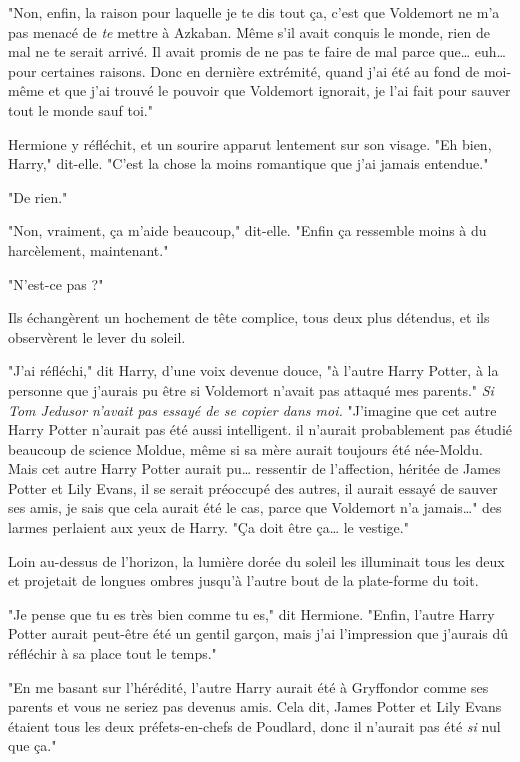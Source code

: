 "Non, enfin, la raison pour laquelle je te dis tout ça, c'est que Voldemort ne m'a pas menacé de \emph{te}  mettre à Azkaban. Même s'il avait conquis le monde, rien de mal ne te serait arrivé. Il avait promis de ne pas te faire de mal parce que… euh… pour certaines raisons. Donc en dernière extrémité, quand j'ai été au fond de moi-même et que j'ai trouvé le pouvoir que Voldemort ignorait, je l'ai fait pour sauver tout le monde sauf toi."

Hermione y réfléchit, et un sourire apparut lentement sur son visage. "Eh bien, Harry," dit-elle. "C'est la chose la moins romantique que j'ai jamais entendue."

"De rien."

"Non, vraiment, ça m'aide beaucoup," dit-elle. "Enfin ça ressemble moins à du harcèlement, maintenant."

"N'est-ce pas ?"

Ils échangèrent un hochement de tête complice, tous deux plus détendus, et ils observèrent le lever du soleil.

"J'ai réfléchi," dit Harry, d'une voix devenue douce, "à l'autre Harry Potter, à la personne que j'aurais pu être si Voldemort n'avait pas attaqué mes parents." \emph{Si Tom Jedusor n'avait pas essayé de se copier dans moi.}  "J'imagine que cet autre Harry Potter n'aurait pas été aussi intelligent. il n'aurait probablement pas étudié beaucoup de science Moldue, même si sa mère aurait toujours été née-Moldu. Mais cet autre Harry Potter aurait pu… ressentir de l'affection, héritée de James Potter et Lily Evans, il se serait préoccupé des autres, il aurait essayé de sauver ses amis, je sais que cela aurait été le cas, parce que Voldemort n'a jamais…" des larmes perlaient aux yeux de Harry. "Ça doit être ça… le vestige."

Loin au-dessus de l'horizon, la lumière dorée du soleil les illuminait tous les deux et projetait de longues ombres jusqu'à l'autre bout de la plate-forme du toit.

"Je pense que tu es très bien comme tu es," dit Hermione. "Enfin, l'autre Harry Potter aurait peut-être été un gentil garçon, mais j'ai l'impression que j'aurais dû réfléchir à sa place tout le temps."

"En me basant sur l'hérédité, l'autre Harry aurait été à Gryffondor comme ses parents et vous ne seriez pas devenus amis. Cela dit, James Potter et Lily Evans étaient tous les deux préfets-en-chefs de Poudlard, donc il n'aurait pas été \emph{si}  nul que ça."

